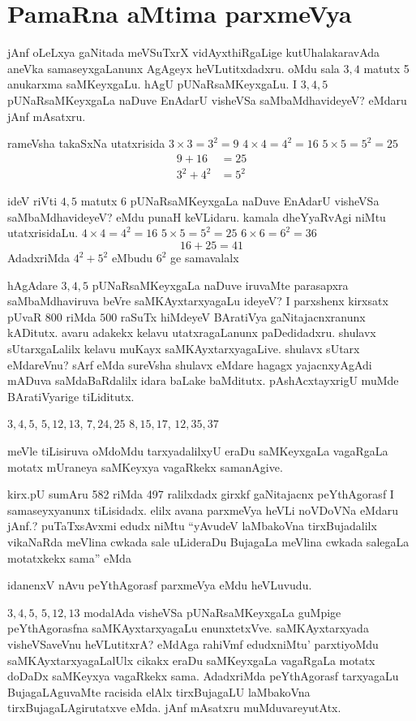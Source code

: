 \chapter{PamaRna aMtima parxmeVya}

jAnf oLeLxya gaNitada meVSuTxrX vidAyxthiRgaLige kutUhalakaravAda aneVka samaseyxgaLanunx AgAgeyx heVLutitxdadxru. oMdu sala $3, 4$ matutx {\rm 5} anukarxma saMKeyxgaLu. hAgU pUNaRsaMKeyxgaLu. I $3, 4, 5$ pUNaRsaMKeyxgaLa naDuve EnAdarU visheVSa saMbaMdhavideyeV? eMdaru jAnf mAsatxru.

rameVsha takaSxNa utatxrisida \quad $3\times 3=3^2=9$ \quad $4\times 4=4^2=16$ \quad $5\times 5=5^2=25$  
\begin{align*}
9+16 &=25\\
3^2+4^2&=5^2
\end{align*}

ideV riVti $4, 5$ matutx {\rm 6} pUNaRsaMKeyxgaLa naDuve EnAdarU visheVSa saMbaMdhavideyeV? eMdu punaH keVLidaru. kamala dheYyaRvAgi niMtu utatxrisidaLu. \quad $4\times 4=4^2=16$ \quad $5\times 5=5^2=25$ \quad $6\times 6=6^2=36$  
$$
16+25 =41
$$
AdadxriMda $4^2+5^2$ eMbudu $6^2$ ge samavalalx

hAgAdare $3, 4, 5$ pUNaRsaMKeyxgaLa naDuve iruvaMte parasapxra saMbaMdhaviruva beVre saMKAyxtarxyagaLu ideyeV? I parxshenx kirxsatx pUvaR $800$ riMda $500$ raSuTx hiMdeyeV BAratiVya gaNitajacnxranunx kADitutx. avaru adakekx kelavu utatxragaLanunx paDedidadxru. shulavx sUtarxgaLalilx kelavu muKayx saMKAyxtarxyagaLive. shulavx sUtarx eMdareVnu? sArf eMda sureVsha shulavx eMdare hagagx yajacnxyAgAdi mADuva saMdaBaRdalilx idara baLake baMditutx. pAshAcxtayxrigU muMde BAratiVyarige tiLiditutx.

$3, 4, 5$, \quad $5, 12, 13$, \quad $7, 24, 25$ \quad $8, 15, 17$, \quad $12, 35, 37$

meVle tiLisiruva oMdoMdu tarxyadalilxyU eraDu saMKeyxgaLa vagaRgaLa motatx mUraneya saMKeyxya vagaRkekx samanAgive.

kirx.pU sumAru {\rm 582} riMda {\rm 497} ralilxdadx girxkf gaNitajacnx  peYthAgorasf I samaseyxyanunx tiLisidadx. elilx avana parxmeVya heVLi noVDoVNa eMdaru jAnf.? puTaTxsAvxmi edudx niMtu ``yAvudeV laMbakoVna tirxBujadalilx vikaNaRda meVlina cwkada sale uLideraDu BujagaLa meVlina cwkada salegaLa motatxkekx sama'' eMda

idanenxV nAvu peYthAgorasf parxmeVya eMdu heVLuvudu.

 $3, 4, 5$, \quad $5, 12, 13$ modalAda visheVSa pUNaRsaMKeyxgaLa guMpige peYthAgo\-rasfna saMKAyxtarxyagaLu enunxtetxVve. saMKAyxtarxyada visheVSaveVnu heVLutitxrA? eMdAga rahiVmf edudxniMtu' parxtiyoMdu saMKAyxtarxyagaLalUlx cikakx eraDu saMKeyxgaLa vagaRgaLa motatx doDaDx saMKeyxya vagaRkekx sama. AdadxriMda peYthAgorasf tarxyagaLu BujagaLAguvaMte racisida elAlx tirxBujagaLU laMbakoVna tirxBujagaLAgirutatxve eMda. jAnf mAsatxru muMduvareyutAtx.

